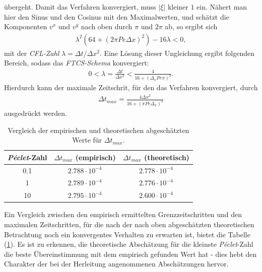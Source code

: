 \documentclass[12pt,a4paper,titlepage,headinclude,bibtotoc]{scrartcl}
\begin{document}
übergeht. Damit das Verfahren konvergiert, muss $|\xi|$ kleiner $1$ ein. Nähert man hier den Sinus und den Cosinus mit den Maximalwerten, und schätzt die Komponenten $v^x$ und $v^y$ nach oben durch $\pi$ und $2\pi$ ab, so ergibt sich
\begin{align}
\lambda^2 \left(64 + (2 \pi Pe \Delta x)^2 \right) -16 \lambda <0,
\end{align}
mit der \textit{CFL-Zahl} $\lambda = \Delta t/\Delta x^2$.
Eine Lösung dieser Ungleichung ergibt folgenden Bereich, sodass das \textit{FTCS-Schema} konvergiert:
\begin{align}
0 < \lambda = \frac{\Delta t}{\Delta x^2} < \frac{4}{16 + (\Delta_x Pe \pi)^2}.
\end{align}
Hierdurch kann der maximale Zeitschrit, für den das Verfahren konvergiert, durch
\begin{align}
\label{eq:neumann_delta_t_max}
\Delta t_{max} = \frac{4 \Delta x^2}{16 + \left(\pi Pe \Delta_x \right)^2}
\end{align}
ausgedrückt werden.

\begin{table}[H]
\centering
	\begin{tabular}{c|c|c}
		\textit{Péclet}-Zahl & $\Delta t_{max}$ (empirisch) & $\Delta t_{max}$ (theoretisch) \\ 
		\hline 
		\hline 
		0.1 & $2.788 \cdot 10^{-4}$  & $2.778 \cdot 10^{-4}$ \\ 
		\hline 
		1 & $2.789 \cdot 10^{-4}$ & $2.776 \cdot 10^{-4}$ \\ 
		\hline 
		10 & $2.795 \cdot 10^{-4}$ & $2.600  \cdot 10^{-4}$ \\ 
		\hline 
	\end{tabular} 
	\caption{Vergleich der empirischen und theoretischen abgeschätzten Werte für $\Delta t_{max}$.}
	\label{tab:delta_t_comp}
\end{table}

Ein Vergleich zwischen den empirisch ermittelten Grenzzeitschritten und den maximalen Zeitschritten, für die nach der nach oben abgeschätzten theoretischen Betrachtung noch ein konvergentes Verhalten zu erwarten ist, bietet die Tabelle (\ref{tab:delta_t_comp}). Es ist zu erkennen, die theoretische Abschätzung für die kleinste \textit{Péclet}-Zahl die beste Übereinstimmung mit dem empirisch gefunden Wert hat - dies hebt den Charakter der bei der Herleitung angenommenen Abschätzungen hervor.  
\\


\newpage
\end{document}

